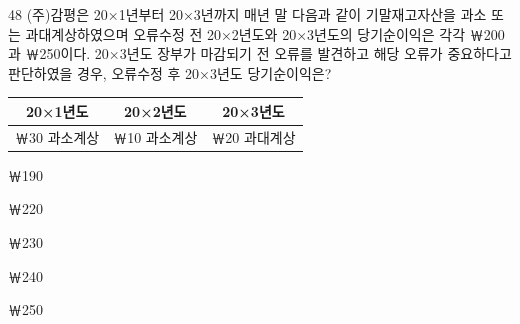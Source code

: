 \begin{question}{48}
(주)감평은 20×1년부터 20×3년까지 매년 말 다음과 같이 기말재고자산을 과소 또는 과대계상하였으며 오류수정 전 20×2년도와 20×3년도의 당기순이익은 각각 ￦200과 ￦250이다. 20×3년도 장부가 마감되기 전 오류를 발견하고 해당 오류가 중요하다고 판단하였을 경우, 오류수정 후 20×3년도 당기순이익은?
\par{\small\centering\begin{tabular}{|c|c|c|}\hline
20×1년도 & 20×2년도 & 20×3년도 \tabularnewline\hline
￦30 과소계상 & ￦10 과소계상 & ￦20 과대계상 \tabularnewline\hline
\end{tabular}\par}
\begin{choices}
  \item ￦190
  \item ￦220
  \item ￦230
  \item ￦240
  \item ￦250
\end{choices}
\end{question}
